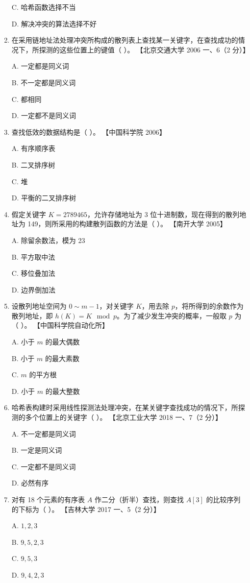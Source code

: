 \documentclass[lang=cn,newtx,10pt,scheme=chinese]{../../elegantbook}
\begin{document}
\begin{enumerate}
    C. 哈希函数选择不当  

    D. 解决冲突的算法选择不好  

    \item 在采用链地址法处理冲突所构成的散列表上查找某一关键字，在查找成功的情况下，所探测的这些位置上的键值（ ）。  
    【北京交通大学 2006 一、6（2 分）】  

    A. 一定都是同义词  

    B. 不一定都是同义词  

    C. 都相同  

    D. 一定都不是同义词  

    \item 查找低效的数据结构是（ ）。  
    【中国科学院 2006】  

    A. 有序顺序表  

    B. 二叉排序树  

    C. 堆  

    D. 平衡的二叉排序树  

    \item 假定关键字 $K = 2 789 465$，允许存储地址为 3 位十进制数，现在得到的散列地址为 149，则所采用的构建散列函数的方法是（ ）。  
    【南开大学 2005】  

    A. 除留余数法，模为 23  

    B. 平方取中法  

    C. 移位叠加法  

    D. 边界倒加法  
    \item 设散列地址空间为 $0 \sim m-1$，对关键字 $K$，用去除 $p$，将所得到的余数作为散列地址，即 $h(K) = K \mod p$。为了减少发生冲突的概率，一般取 $p$ 为（ ）。  
    【中国科学院自动化所】

    A. 小于 $m$ 的最大偶数  

    B. 小于 $m$ 的最大素数  

    C. $m$ 的平方根  

    D. 小于 $m$ 的最大整数  

    \item 哈希表构建时采用线性探测法处理冲突，在某关键字查找成功的情况下，所探测的多个位置上的关键字（ ）。  
    【北京工业大学 2018 一、7（2 分）】  

    A. 不一定都是同义词  

    B. 一定是同义词  

    C. 一定都不是同义词  

    D. 必然有序  

    \item 对有 18 个元素的有序表 $A$ 作二分（折半）查找，则查找 $A[3]$ 的比较序列的下标为（ ）。  
    【吉林大学 2017 一、5（2 分）】  

    A. $1, 2, 3$  

    B. $9, 5, 2, 3$  

    C. $9, 5, 3$  

    D. $9, 4, 2,3$  

\end{enumerate}
\end{document}
